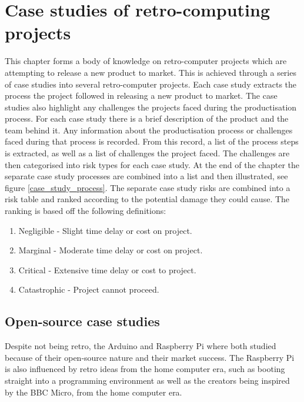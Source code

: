 

\chapter{Case studies of retro-computing projects}
\label{Chapter3}
This chapter forms a body of knowledge on retro-computer projects which are attempting to release a new product to market. This is achieved through a series of case studies into several retro-computer projects. Each case study extracts the process the project followed in releasing a new product to market. The case studies also highlight any challenges the projects faced during the productisation process. For each case study there is a brief description of the product and the team behind it. Any information about the productisation process or challenges faced during that process is recorded. From this record, a list of the process steps is extracted, as well as a list of challenges the project faced. The challenges are then categorised into risk types for each case study. At the end of the chapter the separate case study processes are combined into a list and then illustrated, see figure \ref{case_study_process}. The separate case study risks are combined into a risk table and ranked according to the potential damage they could cause. The ranking is based off the following definitions:
\begin{enumerate}
\item Negligible 	- Slight time delay or cost on project.
\item Marginal 		- Moderate time delay or cost on project. 
\item Critical 		- Extensive time delay or cost to project.
\item Catastrophic 	- Project cannot proceed.
\end{enumerate}

\section{Open-source case studies}
Despite not being retro, the Arduino and Raspberry Pi where both studied because of their open-source nature and their market success. The Raspberry Pi is also influenced by retro ideas from the home computer era, such as booting straight into a programming environment as well as the creators being inspired by the BBC Micro, from the home computer era.

